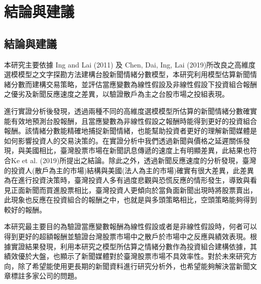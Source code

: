\chapter{結論與建議}
\label{c:experiment}

\section{結論與建議}
本研究主要依據 Ing and Lai (2011) 及 Chen, Dai, Ing, Lai (2019)所改良之高維度選模模型之文字探勘方法建構台股新聞情緒分數模型，本研究利用模型估算新聞情緒分數而建構交易策略，並評估當應變數為線性假設及非線性假設下投資組合報酬之優劣及新聞反應速度之差異，以驗證散戶為主之台股市場之投組表現。

進行實證分析後發現，透過兩種不同的高維度選模模型所估算的新聞情緒分數確實能有效地預測台股報酬，且當應變數為非線性假設之報酬時能得到更好的投資組合報酬。該情緒分數能精確地捕捉新聞情緒，也能幫助投資者更好的理解新聞媒體是如何影響投資人的交易決策的。在實證分析中我們透過新聞與價格之延遲關係發現，與美國相比，臺灣股票市場在新聞訊息傳遞的速度上有明顯差異，此結果也符合Ke et al. (2019)所提出之結論。除此之外，透過新聞反應速度的分析發現，臺灣的投資人(散戶為主的市場)結構與美國(法人為主的市場)確實有很大差異，此差異為在進行投資決策時，臺灣投資人多有過度悲觀與恐慌反應的情形發生，導致與看見正面新聞而買進股票相比，臺灣投資人更傾向於當負面新聞出現時將股票賣出，此現象也反應在投資組合的報酬之中，也就是與多頭策略相比，空頭策略能夠得到較好的報酬。

本研究最主要目的為驗證當應變數報酬為線性假設或者是非線性假設時，何者可以得到更好的超額報酬並驗證台灣股票市場中之散戶於市場中之反應與績效表現。根據實證結果發現，利用本研究之模型所估算之情緒分數作為投資組合建構依據，其績效優於大盤，也顯示了新聞媒體對於臺灣股票市場不具效率性。對於未來研究方向，除了希望能使用更長期的新聞資料進行研究分析外，也希望能夠解決當新聞文章標註多家公司的問題。